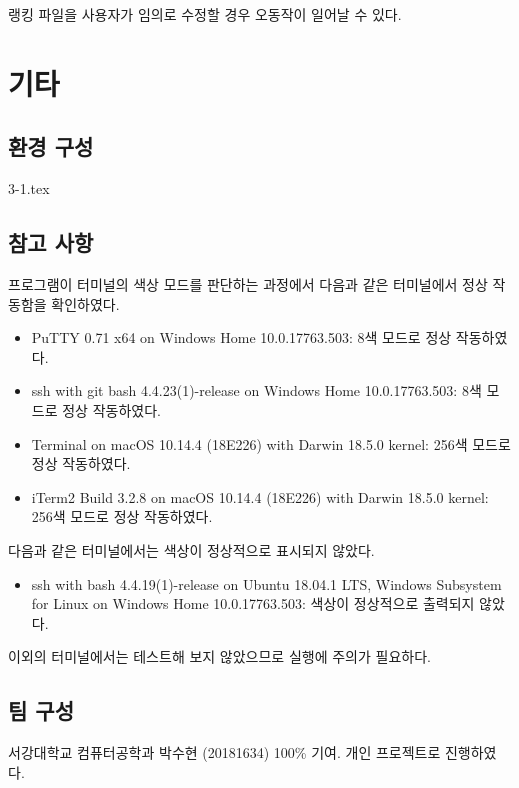 랭킹 파일을 사용자가 임의로 수정할 경우 오동작이 일어날 수 있다.

\section{기타}
\subsection{환경 구성}
{3-1.tex}

\subsection{참고 사항}
프로그램이 터미널의 색상 모드를 판단하는 과정에서 다음과 같은 터미널에서 정상 작동함을 확인하였다.
\begin{itemize}
    \item PuTTY 0.71 x64 on Windows Home 10.0.17763.503: 8색 모드로 정상 작동하였다.
    \item ssh with git bash 4.4.23(1)-release on Windows Home 10.0.17763.503: 8색 모드로 정상 작동하였다.
    \item Terminal on macOS 10.14.4 (18E226) with Darwin 18.5.0 kernel: 256색 모드로 정상 작동하였다.
    \item iTerm2 Build 3.2.8 on macOS 10.14.4 (18E226) with Darwin 18.5.0 kernel: 256색 모드로 정상 작동하였다.
\end{itemize} 

다음과 같은 터미널에서는 색상이 정상적으로 표시되지 않았다.
\begin{itemize}
    \item ssh with bash 4.4.19(1)-release on Ubuntu 18.04.1 LTS, Windows Subsystem for Linux on Windows Home 10.0.17763.503: 색상이 정상적으로 출력되지 않았다.
\end{itemize}
  
이외의 터미널에서는 테스트해 보지 않았으므로 실행에 주의가 필요하다.

\subsection{팀 구성}
서강대학교 컴퓨터공학과 박수현 (20181634) 100\% 기여. 개인 프로젝트로 진행하였다.

